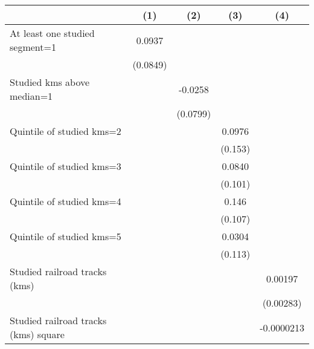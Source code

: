 {
\def\sym#1{\ifmmode^{#1}\else\(^{#1}\)\fi}
\begin{tabular}{l*{4}{c}}
\hline\hline
                    &\multicolumn{1}{c}{(1)}         &\multicolumn{1}{c}{(2)}         &\multicolumn{1}{c}{(3)}         &\multicolumn{1}{c}{(4)}         \\
\hline
At least one studied segment=1&      0.0937         &                     &                     &                     \\
                    &    (0.0849)         &                     &                     &                     \\
[1em]
Studied kms above median=1&                     &     -0.0258         &                     &                     \\
                    &                     &    (0.0799)         &                     &                     \\
[1em]
Quintile of studied kms=2&                     &                     &      0.0976         &                     \\
                    &                     &                     &     (0.153)         &                     \\
[1em]
Quintile of studied kms=3&                     &                     &      0.0840         &                     \\
                    &                     &                     &     (0.101)         &                     \\
[1em]
Quintile of studied kms=4&                     &                     &       0.146         &                     \\
                    &                     &                     &     (0.107)         &                     \\
[1em]
Quintile of studied kms=5&                     &                     &      0.0304         &                     \\
                    &                     &                     &     (0.113)         &                     \\
[1em]
Studied railroad tracks (kms)&                     &                     &                     &     0.00197         \\
                    &                     &                     &                     &   (0.00283)         \\
[1em]
Studied railroad tracks (kms) square&                     &                     &                     &  -0.0000213         \\

\end{tabular}}
